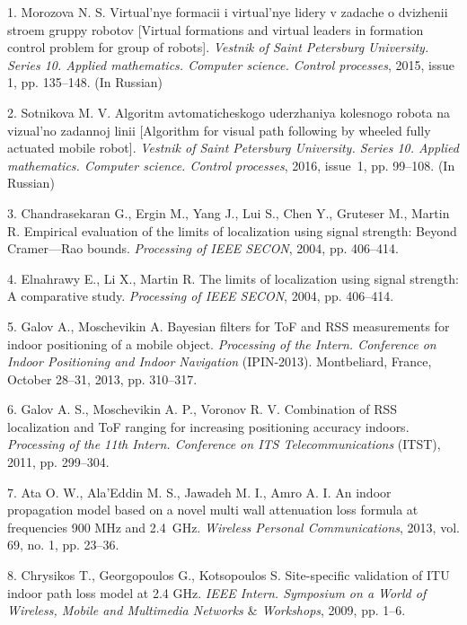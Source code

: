 


{\footnotesize

\vskip 4mm


\vskip 4mm


1. Morozova N. S. Virtual'nye formacii i virtual'nye lidery v
zadache o dvizhenii stroem gruppy robotov [Virtual formations and
virtual leaders in formation control problem for group of robots].
{\it Vestnik of Saint Petersburg University. Series 10. Applied
mathematics. Computer science. Control processes}, 2015, issue 1,
pp. 135--148. (In Russian)

2. Sotnikova M. V. Algoritm avtomaticheskogo uderzhaniya kolesnogo
robota na vizual'no zadannoj linii [Algorithm for visual path
following by wheeled fully actuated mobile robot]. {\it Vestnik of
Saint Petersburg University. Series 10. Applied mathematics.
Computer science. Control processes}, 2016, issue~1, pp. 99--108.
(In Russian)

3. Chandrasekaran G., Ergin M., Yang J., Lui S., Chen Y., Gruteser
M., Martin R. Empirical evaluation of the limits of localization
using signal strength: Beyond Cramer---Rao bounds. {\it Processing
of IEEE SECON}, 2004, pp. 406--414.

4. Elnahrawy E., Li X., Martin R. The limits of localization using
signal strength: A comparative study. {\it Processing of IEEE
SECON}, 2004, pp. 406--414.

5. Galov A., Moschevikin A. Bayesian filters for ToF and RSS
measurements for indoor positioning of a mobile object. {\it
Processing of the Intern. Conference on Indoor Positioning and
Indoor Navigation} (IPIN-2013). Montbeliard, France, October
28--31, 2013, pp. 310--317.

6. Galov A. S., Moschevikin A. P., Voronov R. V. Combination of
RSS localization and ToF ranging for increasing positioning
accuracy indoors. {\it Processing of the 11th Intern. Conference
on ITS Telecommunications} (ITST), 2011, pp. 299--304.

7. Ata O. W., Ala'Eddin M. S., Jawadeh M. I., Amro A. I. An indoor
propagation model based on a novel multi wall attenuation loss
formula at frequencies 900 MHz and 2.4~GHz. {\it Wireless Personal
Communications}, 2013, vol. 69, no. 1, pp. 23--36.

8. Chrysikos T., Georgopoulos G., Kotsopoulos S. Site-specific
validation of ITU indoor path loss model at 2.4 GHz. {\it IEEE
Intern. Symposium on a World of Wireless, Mobile and Multimedia
Networks $\&$ Workshops}, 2009, pp. 1--6.

}
